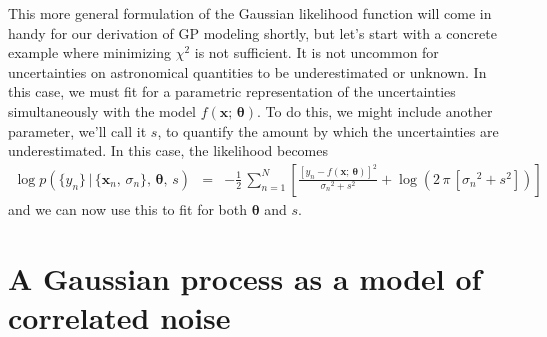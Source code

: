 \documentclass[modern, letterpaper]{aastex61}
\newcommand{\eqlabel}[1]{\label{eq:#1}}
\newcommand{\sectlabel}[1]{\label{sect:#1}}
\newcommand{\bvec}[1]{{\ensuremath{\boldsymbol{#1}}}}
\begin{document}
This more general formulation of the Gaussian likelihood function will come in
handy for our derivation of GP modeling shortly, but let's start with a
concrete example where minimizing $\chi^2$ is not sufficient.
It is not uncommon for uncertainties on astronomical quantities to be
underestimated or unknown.
In this case, we must fit for a parametric representation of the uncertainties
simultaneously with the model $f(\bvec{x};\,\bvec{\theta})$.
To do this, we might include another parameter, we'll call it $s$, to quantify
the amount by which the uncertainties are underestimated.
In this case, the likelihood becomes
\begin{eqnarray}\eqlabel{jitter-loglike}
\log p(\{y_n\}\,|\,\{\bvec{x}_n,\,\sigma_n\},\,\bvec{\theta},\,s) &=&
    -\frac{1}{2}\,\sum_{n=1}^N\left[
    \frac{{[y_n-f(\bvec{x};\,\bvec{\theta})]}^2}{{\sigma_n}^2 + s^2}
    +\log {(2\,\pi\,[{\sigma_n}^2+s^2])}
    \right]
\end{eqnarray}
and we can now use this to fit for both $\bvec{\theta}$ and $s$.

\section{A Gaussian process as a model of correlated noise}
\sectlabel{corr-noise}
\end{document}
